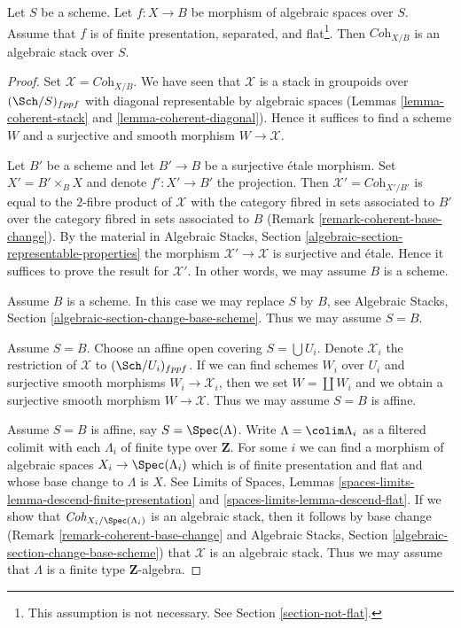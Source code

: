 \begin{theorem}
\label{theorem-coherent-algebraic}
Let $S$ be a scheme. Let $f : X \to B$ be morphism of algebraic spaces
over $S$. Assume that $f$ is of finite presentation, separated, and
flat\footnote{This assumption is not necessary. See
Section \ref{section-not-flat}.}. Then $\textit{Coh}_{X/B}$ is
an algebraic stack over $S$.
\end{theorem}

\begin{proof}
Set $\mathcal{X} = \textit{Coh}_{X/B}$. We have seen that $\mathcal{X}$
is a stack in groupoids over $(\Sch/S)_{fppf}$ with diagonal representable
by algebraic spaces
(Lemmas \ref{lemma-coherent-stack} and \ref{lemma-coherent-diagonal}).
Hence it suffices to find a scheme $W$ and a surjective and smooth
morphism $W \to \mathcal{X}$.

\medskip\noindent
Let $B'$ be a scheme and let $B' \to B$ be a surjective \'etale morphism.
Set $X' = B' \times_B X$ and denote $f' : X' \to B'$ the projection.
Then $\mathcal{X}' = \textit{Coh}_{X'/B'}$ is equal to the $2$-fibre
product of $\mathcal{X}$ with the category fibred in sets
associated to $B'$ over the category fibred in sets associated to $B$
(Remark \ref{remark-coherent-base-change}). By the material in
Algebraic Stacks, Section \ref{algebraic-section-representable-properties}
the morphism $\mathcal{X}' \to \mathcal{X}$ is surjective and \'etale.
Hence it suffices to prove the result for $\mathcal{X}'$.
In other words, we may assume $B$ is a scheme.

\medskip\noindent
Assume $B$ is a scheme. In this case we may replace $S$ by $B$, see
Algebraic Stacks, Section \ref{algebraic-section-change-base-scheme}.
Thus we may assume $S = B$.

\medskip\noindent
Assume $S = B$. Choose an affine open covering $S = \bigcup U_i$.
Denote $\mathcal{X}_i$ the restriction of $\mathcal{X}$ to
$(\Sch/U_i)_{fppf}$. If we can find schemes $W_i$ over $U_i$ and
surjective smooth morphisms $W_i \to \mathcal{X}_i$, then we
set $W = \coprod W_i$ and we obtain a surjective smooth morphism
$W \to \mathcal{X}$. Thus we may assume $S = B$ is affine.

\medskip\noindent
Assume $S = B$ is affine, say $S = \Spec(\Lambda)$.
Write $\Lambda = \colim \Lambda_i$ as a filtered colimit with each $\Lambda_i$
of finite type over $\mathbf{Z}$. For some $i$ we can find
a morphism of algebraic spaces $X_i \to \Spec(\Lambda_i)$
which is of finite presentation and flat and whose base change
to $\Lambda$ is $X$. See
Limits of Spaces, Lemmas
\ref{spaces-limits-lemma-descend-finite-presentation} and
\ref{spaces-limits-lemma-descend-flat}.
If we show that $\textit{Coh}_{X_i/\Spec(\Lambda_i)}$ is an
algebraic stack, then it follows by base change
(Remark \ref{remark-coherent-base-change} and
Algebraic Stacks, Section \ref{algebraic-section-change-base-scheme})
that $\mathcal{X}$ is an algebraic stack.
Thus we may assume that $\Lambda$ is a finite type $\mathbf{Z}$-algebra.


\end{proof}
